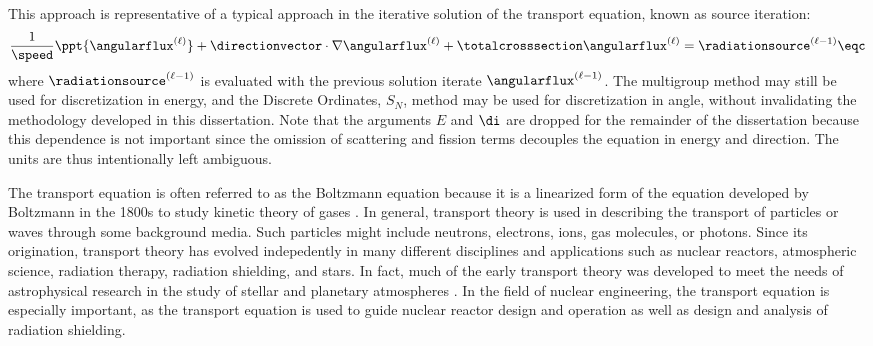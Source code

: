 This approach is representative of a typical approach in the iterative solution
of the transport equation, known as source iteration:
\begin{equation}
  \frac{1}{\speed}\ppt{\angularflux^{(\ell)}}
    + \directionvector\cdot\nabla\angularflux^{(\ell)}
    + \totalcrosssection\angularflux^{(\ell)} = \radiationsource^{(\ell-1)} \eqc
\end{equation}
where $\radiationsource^{(\ell-1)}$ is evaluated with the previous
solution iterate $\angularflux^{(\ell-1)}$. The multigroup
method may still be used for discretization in energy, and the
Discrete Ordinates, $S_N$, method may be used for discretization
in angle, without invalidating the methodology developed in this dissertation.
Note that the arguments $E$ and $\di$ are dropped for the remainder of the dissertation
because this dependence is not important since the omission of scattering
and fission terms decouples the equation in energy and direction.
The units are thus intentionally left ambiguous.

The transport equation is often referred to as the Boltzmann equation
because it is a linearized form of the equation developed by Boltzmann
in the 1800s to study kinetic theory of gases \cite{duderstadt}\cite{glasstone}.
In general, transport theory is used in describing the transport of particles
or waves through some background media. Such particles might include neutrons,
electrons, ions, gas molecules, or photons.
Since its origination, transport theory has evolved indepedently in many
different disciplines and applications such as nuclear reactors,
atmospheric science, radiation therapy, radiation shielding, and stars.
In fact, much of the early transport theory was developed to meet the needs
of astrophysical research in the study of stellar and planetary
atmospheres \cite{duderstadt}.
In the field of nuclear engineering, the transport equation is
especially important, as the transport equation is used to guide nuclear
reactor design and operation as well as design and analysis of
radiation shielding.

